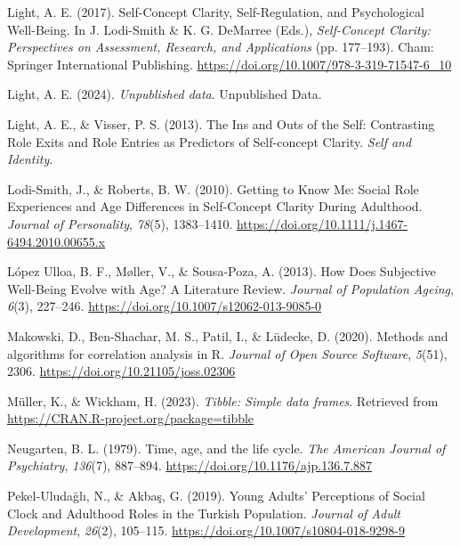 \documentclass[
  man,floatsintext]{apa6}
\newlength{\cslhangindent}
\newlength{\cslentryspacingunit} %
\newenvironment{CSLReferences}[2] %
 {%
  \setlength{\parindent}{0pt}
  \ifodd #1
  \let\oldpar\par
  \def\par{\hangindent=\cslhangindent\oldpar}
  \fi
  \setlength{\parskip}{#2\cslentryspacingunit}
 }%
 {}
\begin{document}
\begin{CSLReferences}{1}{0}
\leavevmode{}%
Light, A. E. (2017). Self-{Concept Clarity}, {Self-Regulation}, and {Psychological Well-Being}. In J. Lodi-Smith \& K. G. DeMarree (Eds.), \emph{Self-{Concept Clarity}: {Perspectives} on {Assessment}, {Research}, and {Applications}} (pp. 177--193). {Cham}: {Springer International Publishing}. \url{https://doi.org/10.1007/978-3-319-71547-6_10}

\leavevmode{}%
Light, A. E. (2024). \emph{Unpublished data}. Unpublished Data.

\leavevmode{}%
Light, A. E., \& Visser, P. S. (2013). The {Ins} and {Outs} of the {Self}: {Contrasting Role Exits} and {Role Entries} as {Predictors} of {Self-concept Clarity}. \emph{Self and Identity}.

\leavevmode{}%
Lodi-Smith, J., \& Roberts, B. W. (2010). Getting to {Know Me}: {Social Role Experiences} and {Age Differences} in {Self-Concept Clarity During Adulthood}. \emph{Journal of Personality}, \emph{78}(5), 1383--1410. \url{https://doi.org/10.1111/j.1467-6494.2010.00655.x}

\leavevmode{}%
López Ulloa, B. F., Møller, V., \& Sousa-Poza, A. (2013). How {Does Subjective Well-Being Evolve} with {Age}? {A Literature Review}. \emph{Journal of Population Ageing}, \emph{6}(3), 227--246. \url{https://doi.org/10.1007/s12062-013-9085-0}

\leavevmode{}%
Makowski, D., Ben-Shachar, M. S., Patil, I., \& Lüdecke, D. (2020). Methods and algorithms for correlation analysis in {R}. \emph{Journal of Open Source Software}, \emph{5}(51), 2306. \url{https://doi.org/10.21105/joss.02306}

\leavevmode{}%
Müller, K., \& Wickham, H. (2023). \emph{Tibble: Simple data frames}. Retrieved from \url{https://CRAN.R-project.org/package=tibble}

\leavevmode{}%
Neugarten, B. L. (1979). Time, age, and the life cycle. \emph{The American Journal of Psychiatry}, \emph{136}(7), 887--894. \url{https://doi.org/10.1176/ajp.136.7.887}

\leavevmode{}%
Pekel-Uludağlı, N., \& Akbaş, G. (2019). Young {Adults}' {Perceptions} of {Social Clock} and {Adulthood Roles} in the {Turkish Population}. \emph{Journal of Adult Development}, \emph{26}(2), 105--115. \url{https://doi.org/10.1007/s10804-018-9298-9}


\end{CSLReferences}
\end{document}
